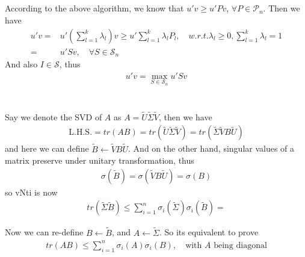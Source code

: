 \documentclass[11pt,a4paper]{ctexart}
\numberwithin{equation}{section}%
\begin{document}
\subsection{}
According to the above algorithm, we know that $ u'v\geq u'Pv $, $ \forall P\in\mathcal{P}_n $. Then we have
\begin{align*}
    u'v = & u'(\sum_{l=1}^k\lambda _l)v \geq u'\sum_{l=1}^k\lambda _lP_l,\quad w.r.t. \lambda _l\geq 0,\sum_{l=1}^k\lambda _l=1 \\
    =&u'Sv,\quad \forall S\in\mathcal{S}_n
\end{align*}
And also $ I\in \mathcal{S} $, thus
\begin{align*}
    u'v = \mathop{ \max }\limits_{S\in\mathcal{S}_n}u'Sv  
\end{align*}


\section{}

\subsection{}
Say we denote the SVD of $ A $ as $ A=\tilde{U}\tilde{\Sigma }\tilde{V} $, then we have
\begin{align*}
     \mathrm{L.H.S.} = tr(AB)=tr(\tilde{U}\tilde{\Sigma }\tilde{V}) = tr(\tilde{\Sigma}\tilde{V}B\tilde{U}) 
\end{align*}
and here we can define $ \tilde{B}\leftarrow \tilde{V}B\tilde{U} $. And on the other hand, singular values of a matrix preserve under unitary transformation, thus
\begin{align*}
    \sigma(\tilde{B})=\sigma(\tilde{V}B\tilde{U})=\sigma (B)
\end{align*}
so vNti is now
\begin{align*}
    tr(\tilde{\Sigma } \tilde{B}) \leq \sum_{i=1}^n \sigma _i(\tilde{\Sigma })\sigma _i(\tilde{B}) =
\end{align*}

Now we can re-define $ B\leftarrow \tilde{B} $, and $ A\leftarrow\tilde{\Sigma } $. So its equivalent to prove
\begin{align*}
    tr(AB)\leq \sum_{i=1}^n\sigma _i(A)\sigma _i(B),\quad \text{with }A\text{ being diagonal}
\end{align*}

\subsection{}
\end{document}
